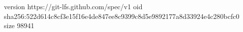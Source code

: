 version https://git-lfs.github.com/spec/v1
oid sha256:522d614c8cf3e15f16e4de847ee8c9399c8d5e9892177a8d33924e4c280bcfc0
size 98941
